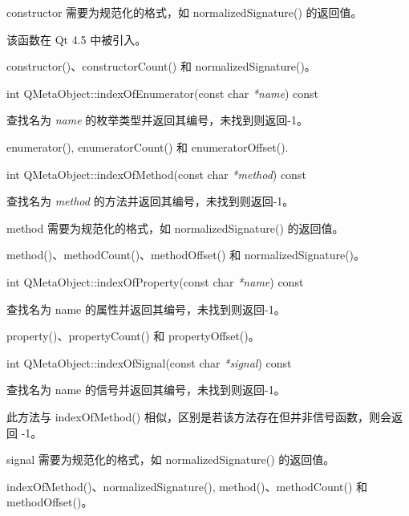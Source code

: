 \begin{notice}
constructor 需要为规范化的格式，如 normalizedSignature() 的返回值。
\end{notice}

该函数在 Qt 4.5 中被引入。

\begin{seeAlso}
constructor()、constructorCount() 和 normalizedSignature()。
\end{seeAlso}

int QMetaObject::indexOfEnumerator(const char \emph{*name}) const

查找名为 \emph{name} 的枚举类型并返回其编号，未找到则返回-1。

\begin{notice}
enumerator(), enumeratorCount() 和 enumeratorOffset().
\end{notice}

int QMetaObject::indexOfMethod(const char \emph{*method}) const

查找名为 \emph{method} 的方法并返回其编号，未找到则返回-1。

\begin{notice}
method 需要为规范化的格式，如 normalizedSignature() 的返回值。
\end{notice}

\begin{seeAlso}
method()、methodCount()、methodOffset() 和 normalizedSignature()。
\end{seeAlso}

int QMetaObject::indexOfProperty(const char \emph{*name}) const

查找名为 name 的属性并返回其编号，未找到则返回-1。

\begin{seeAlso}
property()、propertyCount() 和 propertyOffset()。	
\end{seeAlso}

int QMetaObject::indexOfSignal(const char \emph{*signal}) const

查找名为 name 的信号并返回其编号，未找到则返回-1。

此方法与 indexOfMethod() 相似，区别是若该方法存在但并非信号函数，则会返回 -1。

\begin{notice}
signal 需要为规范化的格式，如 normalizedSignature() 的返回值。	
\end{notice}

\begin{seeAlso}
indexOfMethod()、normalizedSignature(), method()、methodCount() 和 methodOffset()。
\end{seeAlso}

